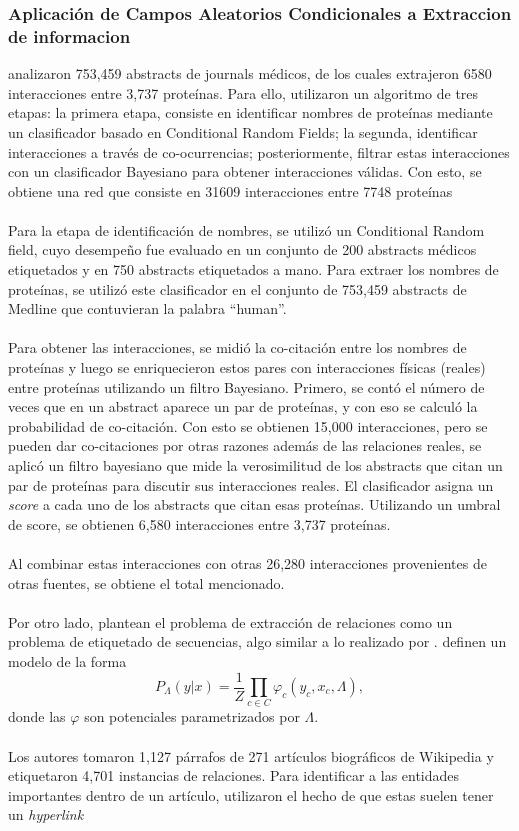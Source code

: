 \documentclass[11pt]{article}
\theoremstyle{plain}
\begin{document}
\subsubsection{Aplicación de Campos Aleatorios Condicionales a Extraccion de informacion}
\cite{ramani2005consolidating} analizaron 753,459 abstracts de journals médicos, de los cuales extrajeron 6580 interacciones entre 3,737 proteínas. Para ello, utilizaron un algoritmo de tres etapas: la primera etapa, consiste en identificar nombres de proteínas mediante un clasificador basado en Conditional Random Fields; la segunda, identificar interacciones a través de co-ocurrencias; posteriormente, filtrar estas interacciones con un clasificador Bayesiano para obtener interacciones válidas. Con esto, se obtiene una red que consiste en 31609 interacciones entre 7748 proteínas\\
\\
Para la etapa de identificación de nombres, se utilizó un Conditional Random field, cuyo desempeño fue evaluado en un conjunto de 200 abstracts médicos etiquetados y en 750 abstracts etiquetados a mano. Para extraer los nombres de proteínas, se utilizó este clasificador en el conjunto de 753,459 abstracts de Medline que contuvieran la palabra “human”.\\
\\
Para obtener las interacciones, se midió la co-citación entre los nombres de proteínas y luego se enriquecieron estos pares con interacciones físicas (reales) entre proteínas utilizando un filtro Bayesiano. Primero, se contó el número de veces que en un abstract aparece un par de proteínas, y con eso se calculó la probabilidad de co-citación. Con esto se obtienen 15,000 interacciones, pero se pueden dar co-citaciones por otras razones además de las relaciones reales, se aplicó un filtro bayesiano que mide la verosimilitud de los abstracts que citan un par de proteínas para discutir sus interacciones reales. El clasificador asigna un \textit{score} a cada uno de los abstracts que citan esas proteínas. Utilizando un umbral de score, se obtienen 6,580 interacciones entre 3,737 proteínas.\\
\\
Al combinar estas interacciones con otras 26,280 interacciones provenientes de otras fuentes, se obtiene el total mencionado.\\
\\
Por otro lado, \cite{culotta2006integrating} plantean el problema de extracción de relaciones como un problema de etiquetado de secuencias, algo similar a lo realizado por \cite{yu2010jointly}.   \cite{culotta2006integrating} definen un modelo de la forma
\[ P_{\Lambda} ( y | x ) =\frac{1}{Z} \prod_{c \in C} \varphi_c ( y_c , x_c, \Lambda ),\]
donde las $\varphi$ son potenciales parametrizados por $\Lambda$.\\
\\
Los autores tomaron 1,127 párrafos de 271 artículos biográficos de Wikipedia y etiquetaron 4,701 instancias de relaciones. Para identificar a las entidades importantes dentro de un artículo, utilizaron el hecho de que estas suelen tener un \textit{hyperlink}
\end{document}
